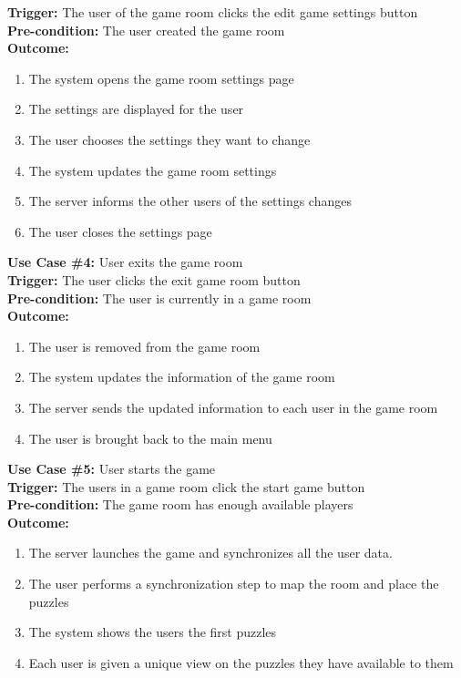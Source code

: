 \documentclass[12pt]{article}
\begin{document}
\textbf{Trigger:} The user of the game room clicks the edit game settings button\\
\textbf{Pre-condition:} The user created the game room\\
\textbf{Outcome:}
\begin{enumerate}
	\item The system opens the game room settings page
    \item The settings are displayed for the user
    \item The user chooses the settings they want to change
    \item The system updates the game room settings
    \item The server informs the other users of the settings changes
    \item The user closes the settings page
\end{enumerate}
\textbf{Use Case \#4:} User exits the game room\\
\textbf{Trigger:} The user clicks the exit game room button\\
\textbf{Pre-condition:} The user is currently in a game room\\
\textbf{Outcome:}
\begin{enumerate}
	\item The user is removed from the game room
    \item The system updates the information of the game room
    \item The server sends the updated information to each user in the game room
    \item The user is brought back to the main menu
\end{enumerate}
\textbf{Use Case \#5:} User starts the game\\
\textbf{Trigger:} The users in a game room click the start game button\\
\textbf{Pre-condition:} The game room has enough available players\\
\textbf{Outcome:}
\begin{enumerate}
	\item The server launches the game and synchronizes all the user data. 
    \item The user performs a synchronization step to map the room and place the puzzles
    \item The system shows the users the first puzzles
    \item Each user is given a unique view on the puzzles they have available to them
\end{enumerate}
\end{document}
